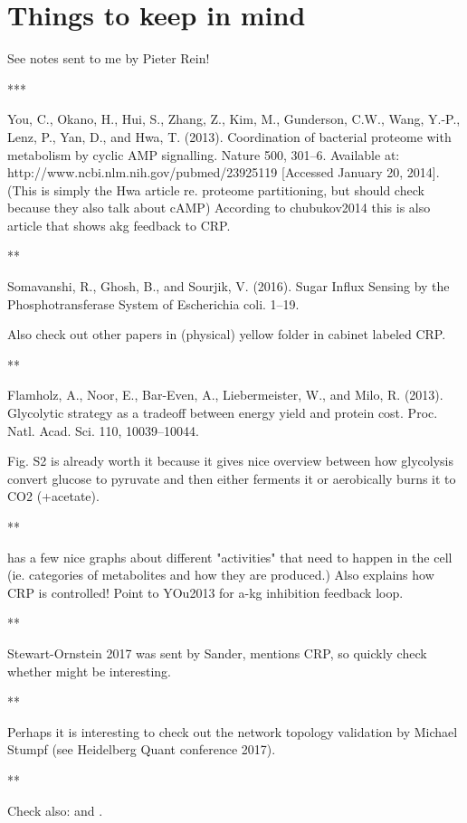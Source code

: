 \section*{Things to keep in mind}

See notes sent to me by Pieter Rein!

***

\cite{You2013}
You, C., Okano, H., Hui, S., Zhang, Z., Kim, M., Gunderson, C.W., Wang, Y.-P., Lenz, P., Yan, D., and Hwa, T. (2013). Coordination of bacterial proteome with metabolism by cyclic AMP signalling. Nature 500, 301–6. Available at: http://www.ncbi.nlm.nih.gov/pubmed/23925119 [Accessed January 20, 2014].
(This is simply the Hwa article re. proteome partitioning, but should check because they also talk about cAMP)
According to chubukov2014 this is also article that shows akg feedback to CRP.

**

\cite{Somavanshi2016}
Somavanshi, R., Ghosh, B., and Sourjik, V. (2016). Sugar Influx Sensing by the Phosphotransferase System of Escherichia coli. 1–19.

Also check out other papers in (physical) yellow folder in cabinet labeled CRP.

**

\cite{Flamholz2013}
Flamholz, A., Noor, E., Bar-Even, A., Liebermeister, W., and Milo, R. (2013). Glycolytic strategy as a tradeoff between energy yield and protein cost. Proc. Natl. Acad. Sci. 110, 10039–10044.

Fig. S2 is already worth it because it gives nice overview between how glycolysis convert glucose to pyruvate and then either ferments it or aerobically burns it to CO2 (+acetate).

**

\cite{chubukov2014} has a few nice graphs about different "activities" that need to happen in the cell (ie. categories of metabolites and how they are produced.) Also explains how CRP is controlled! Point to YOu2013 for a-kg inhibition feedback loop.

**

Stewart-Ornstein 2017 \cite{Stewart-Ornstein2017} was sent by Sander, mentions CRP, so quickly check whether might be interesting.

**

Perhaps it is interesting to check out the network topology validation by Michael Stumpf (see Heidelberg Quant conference 2017). 

**


Check also:
\cite{VanHeerden2017}
and
\cite{Nordholt2017}.

